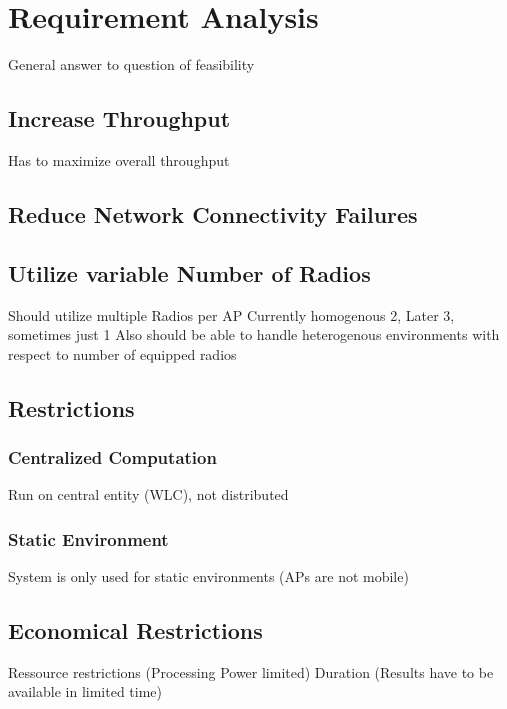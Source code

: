 \chapter{Requirement Analysis}
General answer to question of feasibility
  \section{Increase Throughput}
  Has to maximize overall throughput\newline
  \section{Reduce Network Connectivity Failures}
\section{Utilize variable Number of Radios}
  Should utilize multiple Radios per AP\newline
  Currently homogenous 2, Later 3, sometimes just 1 \newline
  Also should be able to handle heterogenous environments with respect to number of equipped radios \newline
\section{Restrictions}
  \subsection{Centralized Computation}
    Run on central entity (WLC), not distributed \newline 
  \subsection{Static Environment}
    System is only used for static environments (APs are not mobile) \newline
\section{Economical Restrictions}
  Ressource restrictions (Processing Power limited) \newline
  Duration (Results have to be available in limited time) \newline
